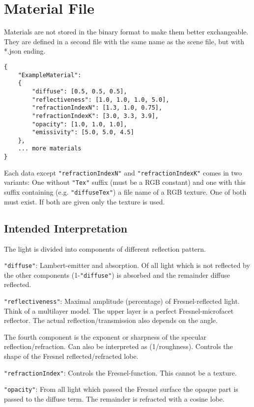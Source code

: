 \documentclass[english,10pt,a4paper,twocolumn,colorscheme=green]{orarticle}
\begin{document}
	\section{Material File}
	\label{sec:materialjson}
	Materials are not stored in the binary format to make them better exchangeable. They are defined in a second file with the same name as the scene file, but with *.json ending.
	\begin{lstlisting}
{
  	"ExampleMaterial": 
  	{
		"diffuse": [0.5, 0.5, 0.5],
		"reflectiveness": [1.0, 1.0, 1.0, 5.0],
		"refractionIndexN": [1.3, 1.0, 0.75],
		"refractionIndexK": [3.0, 3.3, 3.9],
		"opacity": [1.0, 1.0, 1.0],
		"emissivity": [5.0, 5.0, 4.5]
  	},		
	... more materials
}
	\end{lstlisting}
	Each data except \lstinline|"refractionIndexN"| and \lstinline|"refractionIndexK"| comes in two variants: One without \lstinline|"Tex"| suffix (must be a RGB constant) and one with this suffix containing (e.g. \lstinline|"diffuseTex"|) a file name of a RGB texture. One of both must exist. If both are given only the texture is used.
	
	\subsection{Intended Interpretation}
	The light is divided into components of different reflection pattern.
	
	\lstinline|"diffuse"|: Lambert-emitter and absorption. Of all light which is not reflected by the other components (1-\lstinline|"diffuse"|) is absorbed and the remainder diffuse reflected.
	
	\lstinline|"reflectiveness"|: Maximal amplitude (percentage) of Fresnel-reflected light. Think of a multilayer model. The upper layer is a perfect Fresnel-microfacet reflector. The actual reflection/transmission also depends on the angle.
	
	The fourth component is the exponent or sharpness of the specular reflection/refraction. Can also be interpreted as (1/roughness). Controls the shape of the Fresnel reflected/refracted lobe.
	
	\lstinline|"refractionIndex"|: Controls the Fresnel-function. This cannot be a texture.
	
	\lstinline|"opacity"|: From all light which passed the Fresnel surface the opaque part is passed to the diffuse term. The remainder is refracted with a cosine lobe. %
	
\end{document}
